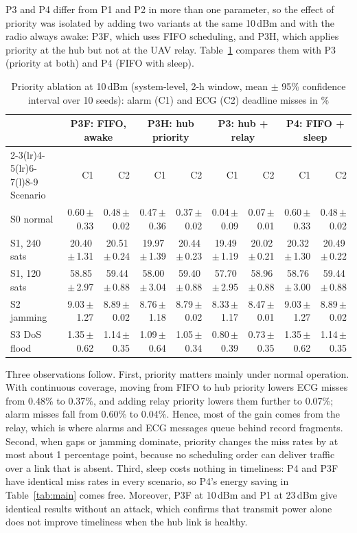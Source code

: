 P3 and P4 differ from P1 and P2 in more than one parameter, so the effect of priority was isolated by adding two variants at the same 10\,dBm and with the radio always awake: P3F, which uses FIFO scheduling, and P3H, which applies priority at the hub but not at the UAV relay. Table~\ref{tab:abl} compares them with P3 (priority at both) and P4 (FIFO with sleep).

\begin{table}[t]
\caption{Priority ablation at 10\,dBm (system-level, 2-h window, mean $\pm$ 95\% confidence interval over 10 seeds): alarm (C1) and ECG (C2) deadline misses in \%}\label{tab:abl}
\centering\scriptsize
\setlength{\tabcolsep}{3pt}
\begin{tabular}{@{}lrrrrrrrr@{}}
\toprule
 & \multicolumn{2}{c}{P3F: FIFO, awake} & \multicolumn{2}{c}{P3H: hub priority} & \multicolumn{2}{c}{P3: hub + relay} & \multicolumn{2}{c}{P4: FIFO + sleep} \\
\cmidrule(lr){2-3}\cmidrule(lr){4-5}\cmidrule(lr){6-7}\cmidrule(l){8-9}
Scenario & C1 & C2 & C1 & C2 & C1 & C2 & C1 & C2 \\
\midrule
S0 normal & 0.60\,$\pm$\,0.33 & 0.48\,$\pm$\,0.02 & 0.47\,$\pm$\,0.36 & 0.37\,$\pm$\,0.02 & 0.04\,$\pm$\,0.09 & 0.07\,$\pm$\,0.01 & 0.60\,$\pm$\,0.33 & 0.48\,$\pm$\,0.02 \\
S1, 240 sats & 20.40\,$\pm$\,1.31 & 20.51\,$\pm$\,0.24 & 19.97\,$\pm$\,1.39 & 20.44\,$\pm$\,0.23 & 19.49\,$\pm$\,1.19 & 20.02\,$\pm$\,0.21 & 20.32\,$\pm$\,1.30 & 20.49\,$\pm$\,0.22 \\
S1, 120 sats & 58.85\,$\pm$\,2.97 & 59.44\,$\pm$\,0.88 & 58.00\,$\pm$\,3.04 & 59.40\,$\pm$\,0.88 & 57.70\,$\pm$\,2.95 & 58.96\,$\pm$\,0.88 & 58.76\,$\pm$\,3.00 & 59.44\,$\pm$\,0.88 \\
S2 jamming & 9.03\,$\pm$\,1.27 & 8.89\,$\pm$\,0.02 & 8.76\,$\pm$\,1.18 & 8.79\,$\pm$\,0.02 & 8.33\,$\pm$\,1.17 & 8.47\,$\pm$\,0.01 & 9.03\,$\pm$\,1.27 & 8.89\,$\pm$\,0.02 \\
S3 DoS flood & 1.35\,$\pm$\,0.62 & 1.14\,$\pm$\,0.35 & 1.09\,$\pm$\,0.64 & 1.05\,$\pm$\,0.34 & 0.80\,$\pm$\,0.39 & 0.73\,$\pm$\,0.35 & 1.35\,$\pm$\,0.62 & 1.14\,$\pm$\,0.35 \\
\bottomrule
\end{tabular}
\end{table}

Three observations follow. First, priority matters mainly under normal operation. With continuous coverage, moving from FIFO to hub priority lowers ECG misses from 0.48\% to 0.37\%, and adding relay priority lowers them further to 0.07\%; alarm misses fall from 0.60\% to 0.04\%. Hence, most of the gain comes from the relay, which is where alarms and ECG messages queue behind record fragments. Second, when gaps or jamming dominate, priority changes the miss rates by at most about 1 percentage point, because no scheduling order can deliver traffic over a link that is absent. Third, sleep costs nothing in timeliness: P4 and P3F have identical miss rates in every scenario, so P4's energy saving in Table~\ref{tab:main} comes free. Moreover, P3F at 10\,dBm and P1 at 23\,dBm give identical results without an attack, which confirms that transmit power alone does not improve timeliness when the hub link is healthy.
